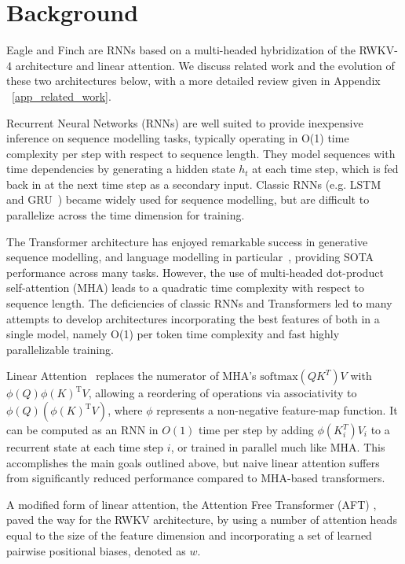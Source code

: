 \section{Background} \label{sec:background}

Eagle and Finch are RNNs based on a multi-headed hybridization of the RWKV-4 architecture and linear attention. We discuss related work and the evolution of these two architectures below, with a more detailed review given in Appendix ~\ref{app_related_work}.

Recurrent Neural Networks (RNNs) are well suited to provide inexpensive inference on sequence modelling tasks, typically operating in O(1) time complexity per step with respect to sequence length. They model sequences with time dependencies by generating a hidden state $h_t$ at each time step, which is fed back in at the next time step as a secondary input. Classic RNNs (e.g. LSTM~\citep{hochreiter1997long} and GRU~\citep{cho2014learning}) became widely used for sequence modelling, but are difficult to parallelize across the time dimension for training.

The Transformer architecture has enjoyed remarkable success in generative sequence modelling, and language modelling in particular~\citep{vaswani2023attention, radford2018improving}, providing SOTA performance across many tasks. However, the use of multi-headed dot-product self-attention (MHA) leads to a quadratic time complexity with respect to sequence length.  The deficiencies of classic RNNs and Transformers led to many attempts to develop architectures incorporating the best features of both in a single model, namely O(1) per token time complexity and fast highly parallelizable training.

Linear Attention~\citep{schmidhuber1992unnormedlinattn, katharopoulos2020lineartransformrers} replaces the numerator of MHA's $\mathrm{softmax}(QK^T)V$ with $\phi(Q)\phi(K)^\mathrm{T}V$, allowing a reordering of operations via associativity to $\phi(Q)(\phi(K)^\mathrm{T}V)$, where $\phi$ represents a non-negative feature-map function.  It can be computed as an RNN in $O(1)$ time per step by adding $\phi(K_i^T)V_i$ to a recurrent state at each time step $i$, or trained in parallel much like MHA. This accomplishes the main goals outlined above, but naive linear attention suffers from significantly reduced performance compared to MHA-based transformers. 

A modified form of linear attention, the Attention Free Transformer (AFT) \citep{zhai2021attention}, paved the way for the RWKV architecture, by using a number of attention heads equal to the size of the feature dimension and incorporating a set of learned pairwise positional biases, denoted as $w$.

